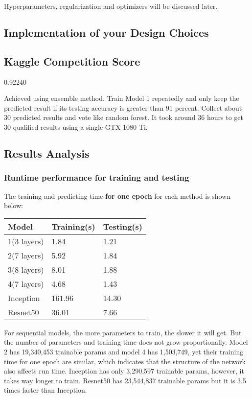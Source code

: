 \documentclass[12pt]{article}
\begin{document}
Hyperparameters, regularization and optimizers will be discussed later.

\subsection{Implementation of your Design Choices}

\subsection{Kaggle Competition Score}

0.92240

Achieved using ensemble method. Train Model 1 repeatedly and only keep the predicted result if its testing accuracy is greater than 91 percent. Collect about 30 predicted results and vote like random forest. It took around 36 hours to get 30 qualified results using a single GTX 1080 Ti.

\subsection{Results Analysis}

\subsubsection{Runtime performance for training and testing}

The training and predicting time \textbf{for one epoch} for each method is shown below:
\begin{center}
\begin{tabular}{|p{2.5cm}|p{2.5cm}|p{2.5cm}|}
\hline
\textbf{Model} & \textbf{Training(s)} & \textbf{Testing(s)}\\ 
\hline
1(3 layers) & 1.84 & 1.21\\ 
\hline
2(7 layers) & 5.92 & 1.84\\ 
\hline
3(8 layers) & 8.01 & 1.88\\ 
\hline
4(7 layers) & 4.68 & 1.43\\
\hline
Inception & 161.96 & 14.30\\
\hline
Resnet50 & 36.01 & 7.66\\
\hline
\end{tabular}
\end{center}

For sequential models, the more parameters to train, the slower it will get. But the number of parameters and training time does not grow proportionally. Model 2 has 19,340,453 trainable params and model 4 has 1,503,749, yet their training time for one epoch are similar, which indicates that the structure of the network also affects run time. Inception has only 3,290,597 trainable params, however, it takes way longer to train. Resnet50 has 23,544,837 trainable params but it is 3.5 times faster than Inception.
\end{document}
